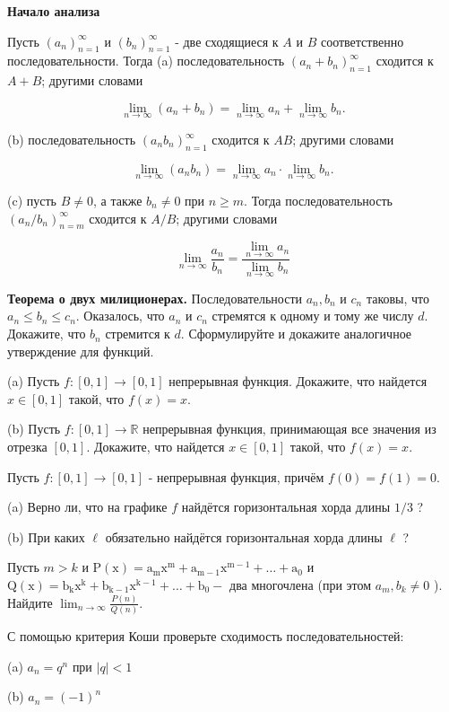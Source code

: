 \centerline{\bf \Huge Начало анализа}

Пусть $\left(a_n\right)_{n=1}^{\infty}$ и $\left(b_n\right)_{n=1}^{\infty}$ - две сходящиеся к $A$ и $B$ соответственно последовательности. Тогда
(a) последовательность $\left(a_n+b_n\right)_{n=1}^{\infty}$ сходится к $A+B$; другими словами

$$
\lim _{n \rightarrow \infty}\left(a_n+b_n\right)=\lim _{n \rightarrow \infty} a_n+\lim _{n \rightarrow \infty} b_n .
$$

(b) последовательность $\left(a_n b_n\right)_{n=1}^{\infty}$ сходится к $A B$; другими словами

$$
\lim _{n \rightarrow \infty}\left(a_n b_n\right)=\lim _{n \rightarrow \infty} a_n \cdot \lim _{n \rightarrow \infty} b_n .
$$

(c) пусть $B \neq 0$, а также $b_n \neq 0$ при $n \geqslant m$. Тогда последовательность $\left(a_n / b_n\right)_{n=m}^{\infty}$ сходится к $A / B$; другими словами

$$
\lim _{n \rightarrow \infty} \frac{a_n}{b_n}=\frac{\lim _{n \rightarrow \infty} a_n}{\lim _{n \rightarrow \infty} b_n}
$$

\textbf{Теорема о двух милиционерах.}
Последовательности $a_n, b_n$ и $c_n$ таковы, что $a_n \leqslant b_n \leqslant c_n$. Оказалось, что $a_n$ и $c_n$ стремятся к одному и тому же числу $d$. Докажите, что $b_n$ стремится к $d$. Сформулируйте и докажите аналогичное утверждение для функций. 

(a) Пусть $f:[0,1] \rightarrow[0,1]$ непрерывная функция. Докажите, что найдется $x \in[0,1]$ такой, что $f(x)=x$.

(b) Пусть $f:[0,1] \rightarrow \mathbb{R}$ непрерывная функция, принимающая все значения из отрезка $[0,1]$. Докажите, что найдется $x \in[0,1]$ такой, что $f(x)=x$.

Пусть $f:[0,1] \rightarrow[0,1]$ - непрерывная функция, причём $f(0)=f(1)=0$.

(a) Верно ли, что на графике $f$ найдётся горизонтальная хорда длины $1 / 3$ ?

(b) При каких $\ell$ обязательно найдётся горизонтальная хорда длины $\ell$ ?

Пусть $m>k$ и $\mathrm{P}(\mathrm{x})=\mathrm{a}_{\mathrm{m}} \mathrm{x}^{\mathrm{m}}+\mathrm{a}_{\mathrm{m}-1} \mathrm{x}^{\mathrm{m}-1}+\ldots+\mathrm{a}_0$ и $\mathrm{Q}(\mathrm{x})=\mathrm{b}_{\mathrm{k}} \mathrm{x}^{\mathrm{k}}+\mathrm{b}_{\mathrm{k}-1} \mathrm{x}^{\mathrm{k}-1}+\ldots+\mathrm{b}_0-$ два многочлена (при этом $a_m, b_k \neq 0$ ). Найдите $\lim _{n \rightarrow \infty} \frac{P(n)}{Q(n)}$.

С помощью критерия Коши проверьте сходимость последовательностей:

(a) $a_n=q^n$ при $|q|<1$

(b) $a_n=(-1)^n$